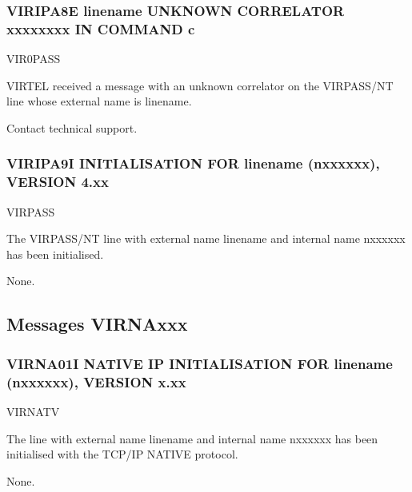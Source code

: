 \documentclass[letterpaper,10pt,english]{sphinxmanual}
\begin{document}
\subsubsection{VIRIPA8E linename UNKNOWN CORRELATOR xxxxxxxx IN COMMAND c}
\label{\detokenize{messages:viripa8e-linename-unknown-correlator-xxxxxxxx-in-command-c}}\begin{description}
\sphinxAtStartPar
VIR0PASS

\sphinxAtStartPar
VIRTEL received a message with an unknown correlator on the VIRPASS/NT line whose external name is linename.

\sphinxAtStartPar
Contact technical support.

\end{description}


\subsubsection{VIRIPA9I INITIALISATION FOR linename (n\sphinxhyphen{}xxxxxx), VERSION 4.xx}
\label{\detokenize{messages:viripa9i-initialisation-for-linename-n-xxxxxx-version-4-xx}}\begin{description}
\sphinxAtStartPar
VIRPASS

\sphinxAtStartPar
The VIRPASS/NT line with external name linename and internal name n\sphinxhyphen{}xxxxxx has been initialised.

\sphinxAtStartPar
None.

\end{description}


\subsection{Messages VIRNAxxx}
\label{\detokenize{messages:messages-virnaxxx}}

\subsubsection{VIRNA01I NATIVE IP INITIALISATION FOR linename (n\sphinxhyphen{}xxxxxx), VERSION x.xx}
\label{\detokenize{messages:virna01i-native-ip-initialisation-for-linename-n-xxxxxx-version-x-xx}}\begin{description}
\sphinxAtStartPar
VIRNATV

\sphinxAtStartPar
The line with external name linename and internal name n\sphinxhyphen{}xxxxxx has been initialised with the TCP/IP NATIVE protocol.

\sphinxAtStartPar
None.

\end{description}
\end{document}
